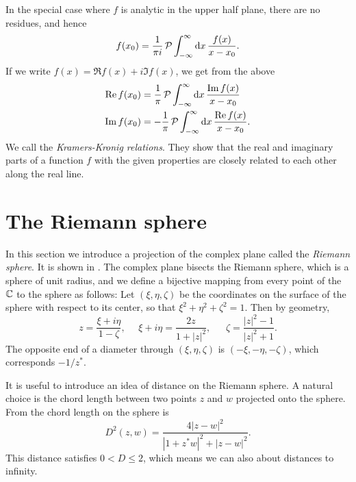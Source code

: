 In the special case where $f$ is analytic in the upper half plane,
there are no residues, and hence
\begin{equation}
  f(x_0)=\frac{1}{\pi i}\,\mathcal{P}
     \int_{-\infty}^{\infty}\dd{x}\frac{f(x)}{x-x_0}.
\end{equation}
If we write $f(x)=\Re f(x)+i\Im f(x)$, we get from the above
\begin{equation}\begin{aligned}\label{eq:kramerKronig}
\mathop{\mathrm{Re}} f(x_0)&=\frac{1}{\pi}\,\mathcal{P}
     \int_{-\infty}^{\infty}\dd{x}\frac{\mathop{\mathrm{Im}} f(x)}{x-x_0}\\
\mathop{\mathrm{Im}} f(x_0)&=-\frac{1}{\pi}\,\mathcal{P}
     \int_{-\infty}^{\infty}\dd{x}\frac{\mathop{\mathrm{Re}} f(x)}{x-x_0}.
\end{aligned}\end{equation}
We call  the 
{\it Kramers-Kronig relations}.
They show that the real and imaginary parts of a function $f$ with the given
properties are closely related to each other along the real line.


\section{The Riemann sphere}


In this section we introduce a projection of the complex plane called the {\it
Riemann sphere}. It is shown in .
The complex plane bisects the Riemann sphere, which is a sphere of unit radius,
and we define a bijective mapping from every point of the $\mathbb{C}$ to the sphere as
follows: Let $(\xi,\eta,\zeta)$ be the coordinates on the surface of the sphere
with respect to its center, so that $\xi^2+\eta^2+\zeta^2=1$.
Then by geometry,
\begin{equation}\label{eq:planeToSphere}
  z=\frac{\xi+i\eta}{1-\zeta},~~~~~~
  \xi+i\eta=\frac{2z}{1+|z|^2},~~~~~~~
  \zeta=\frac{|z|^2-1}{|z|^2+1}.
\end{equation}
The opposite end of a diameter through $(\xi,\eta,\zeta)$ is
$(-\xi,-\eta,-\zeta)$, which corresponds $-1/z^*$.

It is useful to introduce an idea of distance on the Riemann sphere.
A natural choice is the chord length between two points $z$ and $w$
projected onto the sphere. From  
the chord length on the sphere is
\begin{equation}
  D^2(z,w)=\frac{4|z-w|^2}{|1+z^*w|^2+|z-w|^2}.
\end{equation}
This distance satisfies $0<D\leq2$, 
which means we can also about distances to infinity.

